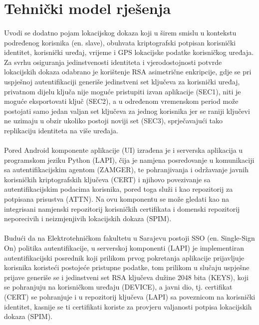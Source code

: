 \section{Tehnički model rješenja}
\paragraph*{}
Uvodi se dodatno pojam lokacijskog dokaza\cite{locproof} koji u širem smislu u kontekstu podređenog korisnika (en. slave), obuhvata kriptografski potpisan korisnički identitet, korisnički uređaj, vrijeme i GPS lokacijske podatke korisničkog uređaja. Za svrhu osiguranja jedinstvenosti identiteta i vjerodostojnosti potvrde lokacijskih dokaza odabrano je korištenje RSA asimetrične enkripcije, gdje se pri uspješnoj autentifikaciji generiše jedinstveni set ključeva za korisnički uređaj, privatnom dijelu ključa nije moguće pristupiti izvan aplikacije (SEC1), niti je moguće eksportovati ključ (SEC2), a u određenom vremenskom period može postojati samo jedan valjan set ključeva za jednog korisnika jer se raniji ključevi ne uzimaju u obzir ukoliko postoji noviji set (SEC3), sprječavajući tako replikaciju identiteta na više uređaja.

\paragraph*{}
Pored Android komponente aplikacije (UI) izrađena je i serverska aplikacija u programskom jeziku Python (LAPI), čija je namjena posredovanje u komunikaciji sa autentifikacijskim agentom (ZAMGER), te pohranjivanja i održavanje javnih korisničkih kriptografskih ključeva (CERT) i njihovo povezivanje sa autentifikacijskim podacima korisnika, pored toga služi i kao repozitorij za potpisana prisustva (ATTN). Na ovu komponentu se može gledati kao na integrisani namjenski repozitorij korisničkih certifikata i domenski repozitorij neporecivih i neizmjenjivih lokacijskih dokaza (SPIM).

\paragraph*{}
Budući da na Elektrotehničkom fakultetu u Sarajevu postoji SSO (en. Single-Sign On) politika autentifikacije, u serverskoj komponenti (LAPI) je implementiran autentifikacijski posrednik koji prilikom prvog pokretanja aplikacije prijavljuje korisnika koristeći postojeće pristupne podatke, tom prilikom u slučaju uspješne prijave generiše se i jedinstveni set RSA ključeva dužine 2048 bita (KEYS), koji se pohranjuju na korisničkom uređaju (DEVICE), a javni dio, tj. certifikat (CERT) se pohranjuje i u repozitorij ključeva (LAPI) sa poveznicom na korisnički identitet, kasnije se ti certifikati koriste za provjeru valjanosti potpisa lokacijskih dokaza (SPIM).

